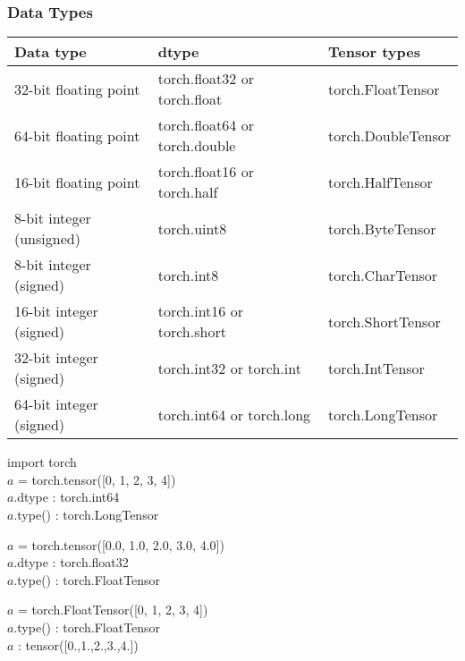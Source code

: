 \documentclass[14 pt]{beamer}
\begin{document}
\begin{frame}
  \frametitle{Data Types}
\begin{table}
\footnotesize{ 
  \begin{tabular}{lll}
\hline
    Data type & dtype & Tensor types \\
\hline
    32-bit floating point & torch.float32 or torch.float &
                                                           torch.FloatTensor
    \\
    64-bit floating point & torch.float64 or torch.double &
                                                           torch.DoubleTensor
    \\
  16-bit floating point & torch.float16 or torch.half &
                                                           torch.HalfTensor
    \\
  
    8-bit integer (unsigned) & torch.uint8  &
                                                           torch.ByteTensor
    \\
    8-bit integer (signed) & torch.int8 &
                                                           torch.CharTensor
    \\
    16-bit integer (signed) & torch.int16 or torch.short &
                                                           torch.ShortTensor
    \\
    32-bit integer (signed) & torch.int32 or torch.int &
                                                           torch.IntTensor
    \\
    64-bit integer (signed) & torch.int64 or torch.long & 
                                                           torch.LongTensor
    \\
\hline  
  \end{tabular}
}
\end{table}
\end{frame}

\begin{frame}
\begin{block}{}
import torch \\
$a$ = torch.tensor([0, 1, 2, 3, 4])\\
$a$.dtype : torch.int64 \\
$a$.type() : torch.LongTensor
\end{block}
\begin{block}{}
$a$ = torch.tensor([0.0, 1.0, 2.0, 3.0, 4.0])\\
$a$.dtype :  torch.float32 \\
$a$.type() : torch.FloatTensor
\end{block}
\begin{block}{}
$a$ = torch.FloatTensor([0, 1, 2, 3, 4])\\
$a$.type() : torch.FloatTensor \\
$a$ :  tensor([0.,1.,2.,3.,4.])
\end{block}
\end{frame}
\end{document}
